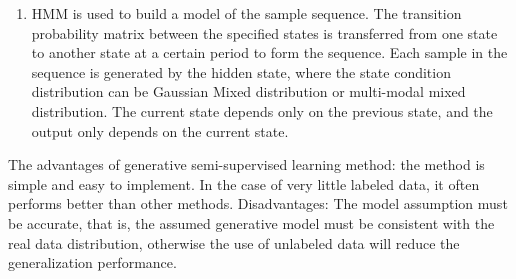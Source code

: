 \documentclass[11pt,en]{elegantpaper}
\begin{document}
\begin{enumerate}
	\item HMM is used to build a model of the sample sequence. The transition probability matrix between the specified states is transferred from one state to another state at a certain period to form the sequence. Each sample in the sequence is generated by the hidden state, where the state condition distribution can be Gaussian Mixed distribution or multi-modal mixed distribution. The current state depends only on the previous state, and the output only depends on the current state.
\end{enumerate}

The advantages of generative semi-supervised learning method: the method is simple and easy to implement. In the case of very little labeled data, it often performs better than other methods.
Disadvantages: The model assumption must be accurate, that is, the assumed generative model must be consistent with the real data distribution, otherwise the use of unlabeled data will reduce the generalization performance.
\end{document}
